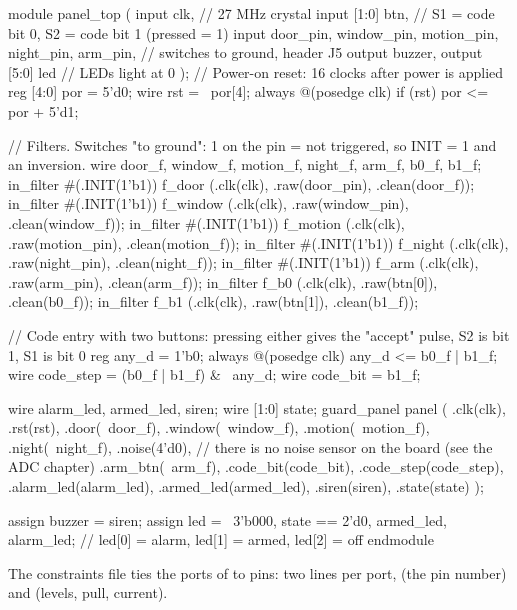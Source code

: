 \begin{vcode}
module panel_top (
    input        clk,            // 27 MHz crystal
    input  [1:0] btn,            // S1 = code bit 0, S2 = code bit 1 (pressed = 1)
    input        door_pin, window_pin, motion_pin, night_pin, arm_pin,   // switches to ground, header J5
    output       buzzer,
    output [5:0] led             // LEDs light at 0
);
    // Power-on reset: 16 clocks after power is applied
    reg [4:0] por = 5'd0;
    wire rst = ~por[4];
    always @(posedge clk) if (rst) por <= por + 5'd1;

    // Filters. Switches "to ground": 1 on the pin = not triggered, so INIT = 1 and an inversion.
    wire door_f, window_f, motion_f, night_f, arm_f, b0_f, b1_f;
    in_filter #(.INIT(1'b1)) f_door   (.clk(clk), .raw(door_pin),   .clean(door_f));
    in_filter #(.INIT(1'b1)) f_window (.clk(clk), .raw(window_pin), .clean(window_f));
    in_filter #(.INIT(1'b1)) f_motion (.clk(clk), .raw(motion_pin), .clean(motion_f));
    in_filter #(.INIT(1'b1)) f_night  (.clk(clk), .raw(night_pin),  .clean(night_f));
    in_filter #(.INIT(1'b1)) f_arm    (.clk(clk), .raw(arm_pin),    .clean(arm_f));
    in_filter                f_b0     (.clk(clk), .raw(btn[0]),     .clean(b0_f));
    in_filter                f_b1     (.clk(clk), .raw(btn[1]),     .clean(b1_f));

    // Code entry with two buttons: pressing either gives the "accept" pulse, S2 is bit 1, S1 is bit 0
    reg any_d = 1'b0;
    always @(posedge clk) any_d <= b0_f | b1_f;
    wire code_step = (b0_f | b1_f) & ~any_d;
    wire code_bit  = b1_f;

    wire alarm_led, armed_led, siren;
    wire [1:0] state;
    guard_panel panel (
        .clk(clk), .rst(rst),
        .door(~door_f), .window(~window_f), .motion(~motion_f), .night(~night_f),
        .noise(4'd0),                          // there is no noise sensor on the board (see the ADC chapter)
        .arm_btn(~arm_f),
        .code_bit(code_bit), .code_step(code_step),
        .alarm_led(alarm_led), .armed_led(armed_led), .siren(siren), .state(state)
    );

    assign buzzer = siren;
    assign led    = ~{3'b000, state == 2'd0, armed_led, alarm_led};   // led[0] = alarm, led[1] = armed, led[2] = off
endmodule
\end{vcode}

The constraints file ties the ports of  to pins: two lines per
port,  (the pin number) and  (levels, pull,
current).

